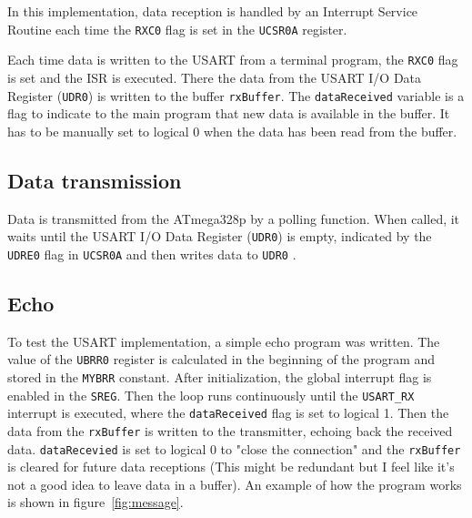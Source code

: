 \documentclass[11pt,a4paper,titlepage]{article}
\begin{document}
	In this implementation, data reception is handled by an Interrupt Service Routine each time the \verb|RXC0| flag is set in the \verb|UCSR0A| register.
	
	Each time data is written to the USART from a terminal program, the \verb|RXC0| flag is set and the ISR is executed. There the data from the USART I/O Data Register (\verb|UDR0|) is written to the buffer \verb|rxBuffer|. The \verb|dataReceived| variable is a flag to indicate to the main program that new data is available in the buffer. It has to be manually set to logical 0 when the data has been read from the buffer.
	
	

	\subsection{Data transmission}
	
	Data is transmitted from the ATmega328p by a polling function. When called, it waits until the USART I/O Data Register (\verb|UDR0|) is empty, indicated by the \verb|UDRE0| flag in \verb|UCSR0A| and then writes data to \verb|UDR0| .
	
	

	\subsection{Echo}
	
	To test the USART implementation, a simple echo program was written.
	The value of the \verb|UBRR0| register is calculated in the beginning of the program and stored in the \verb|MYBRR| constant.
	After initialization, the global interrupt flag is enabled in the \verb|SREG|. Then the loop runs continuously until the \verb|USART_RX| interrupt is executed, where the \verb|dataReceived| flag is set to logical 1. Then the data from the \verb|rxBuffer| is written to the transmitter, echoing back the received data. \verb|dataRecevied| is set to logical 0 to "close the connection" and the \verb|rxBuffer| is cleared for future data receptions (This might be redundant but I feel like it's not a good idea to leave data in a buffer). An example of how the program works is shown in figure~\ref{fig:message}.
	
	
	
\end{document}
